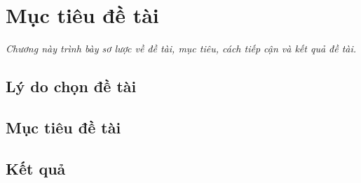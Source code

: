 \chapter{Mục tiêu đề tài}
\label{Chapter1}

\emph{Chương này trình bày sơ lược về đề tài, mục tiêu, cách tiếp cận và kết quả đề tài.}

\section{Lý do chọn đề tài}

\section{Mục tiêu đề tài}

\section{Kết quả}


